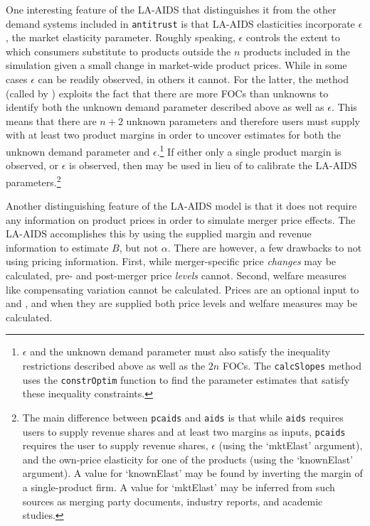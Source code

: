 \documentclass[11pt,numbers=noenddot,pointlessnumbers]{scrreprt}
\newcommand{\atr}{{\tt antitrust}}
\numberwithin{equation}{section}
\begin{document}
One interesting feature of the LA-AIDS that distinguishes
it from the other demand systems included in
\atr{} is that LA-AIDS elasticities incorporate $\epsilon$, the
market elasticity parameter. Roughly speaking, $\epsilon$ controls
the extent to which consumers substitute to products outside
the $n$ products included in the simulation
given a small change in market-wide product prices. While in some cases
$\epsilon$ can be readily observed, in others it cannot. For the latter,
the \verb@calcSlopes@ method (called by \verb@aids@) exploits the fact that there are more
FOCs than unknowns to identify both the unknown demand parameter
described above as well as $\epsilon$. This means that there are
$n+2$ unknown parameters and therefore users must
supply \verb@aids@ with at least two product margins in order to
uncover estimates for both the unknown demand parameter and
$\epsilon$.\footnote{$\epsilon$ and the unknown demand parameter must
  also satisfy the inequality restrictions described above as well as
  the $2n$ FOCs. The
  \texttt{calcSlopes} method uses the \texttt{constrOptim} function to
find the parameter estimates that satisfy these inequality
constraints.} If either only a single product margin is observed,
or $\epsilon$ is observed, then \verb@pcaids@ may be used in lieu of \verb@aids@ to calibrate
the LA-AIDS parameters.\footnote{The main difference between
  \texttt{pcaids} and  \texttt{aids} is that while \texttt{aids} requires
  users to supply revenue shares and at least two margins as inputs,  \texttt{pcaids} requires the
  user to supply revenue shares, $\epsilon$ (using the `mktElast' argument), and the own-price
  elasticity for one of the products (using the `knownElast'
  argument). A value for `knownElast' may be found by
  inverting the margin of a single-product firm. A value for
  `mktElast' may be inferred from such sources as
  merging party documents, industry reports, and academic studies.}

Another distinguishing feature of the LA-AIDS model is that it does not require any information on product
prices in order to simulate merger price effects. The LA-AIDS accomplishes this by
using the supplied margin and revenue information to estimate $B$, but not $\alpha$. There are
however, a few drawbacks to not using pricing information.  First, while
merger-specific price \emph{changes} may be calculated, pre- and post-merger
price \emph{levels} cannot. Second, welfare measures like
compensating variation cannot be calculated.  Prices are an optional
input to \verb@aids@ and \verb@pcaids@, and when they are supplied both
price levels and welfare measures may be calculated.
\end{document}

